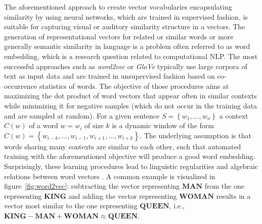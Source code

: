 The aforementioned approach to create vector vocabularies encapsulating similarity by using neural networks, which are trained in supervised fashion, is suitable for capturing visual or auditory similarity structure in a vectors.
The generation of representational vectors for related or similar words or more generally semantic similarity in language is a problem often referred to as word embedding, which is a research question related to computational \acl{NLP}.
The most successful approaches such as \textit{word2vec} \parencite{Mikolov2013a, Mikolov2013} or \textit{\ac{GloVe}} \parencite{Pennington2014} typically use large corpora of text as input data and are trained in unsupervised fashion based on co-occurrence statistics of words.
The objective of those procedures aims at maximizing the dot product of word vectors that appear often in similar contexts while minimizing it for negative samples (which do not occur in the training data and are sampled at random).
For a given sentence $S=\left\{w_1, \ldots, w_n\right\}$ a context $C(w)$ of a word $w=w_i$ of size $k$ is a dynamic window of the form $C(w) = \left\{ w_{i-k}, \ldots, w_{i-1}, w_{i+1}, \ldots, w_{i+k}\right\}$.
The underlying assumption is that words sharing many contexts are similar to each other, such that automated training with the aforementioned objective will produce a good word embedding.
Surprisingly, these learning procedures lead to linguistic regularities and algebraic relations between word vectors \parencite{Mikolov2013b}.
A common example is visualized in figure~\ref{fig:word2vec}: subtracting the vector representing $\mathbf{MAN}$ from the one representing $\mathbf{KING}$ and adding the vector representing $\mathbf{WOMAN}$ results in a vector most similar to the one representing $\mathbf{QUEEN}$, i.e., $\mathbf{KING} - \mathbf{MAN} + \mathbf{WOMAN} \approx \mathbf{QUEEN}$.
